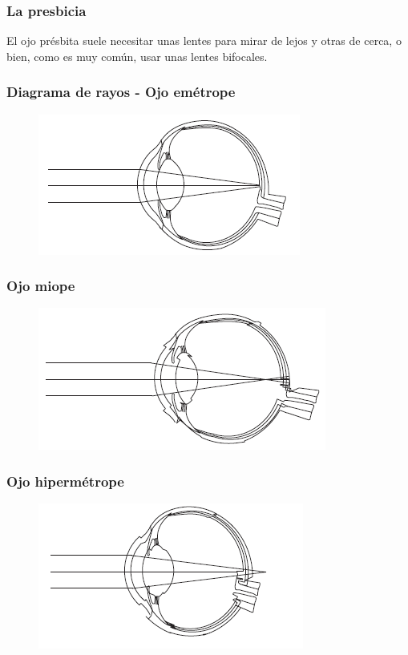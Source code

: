 \documentclass[14pt]{beamer}
\begin{document}
\begin{frame}
\frametitle{La presbicia}
El ojo présbita suele necesitar unas lentes para mirar de lejos y otras de cerca, \pause o bien, como es muy común, usar unas lentes bifocales.
\end{frame}
\begin{frame}
\frametitle{Diagrama de rayos - Ojo emétrope}
\begin{figure}
    \centering
    \includegraphics[scale=0.8]{Imagenes/Ojo_01_Emetrope.png}
\end{figure}
\end{frame}
\begin{frame}
\frametitle{Ojo miope}
\begin{figure}
    \centering
    \includegraphics[scale=0.8]{Imagenes/Ojo_02_Miope.png}
\end{figure}
\end{frame}
\begin{frame}
\frametitle{Ojo hipermétrope}
\begin{figure}
    \centering
    \includegraphics[scale=0.8]{Imagenes/Ojo_03_Hipermetrope.png}
\end{figure}
\end{frame}
\end{document}
